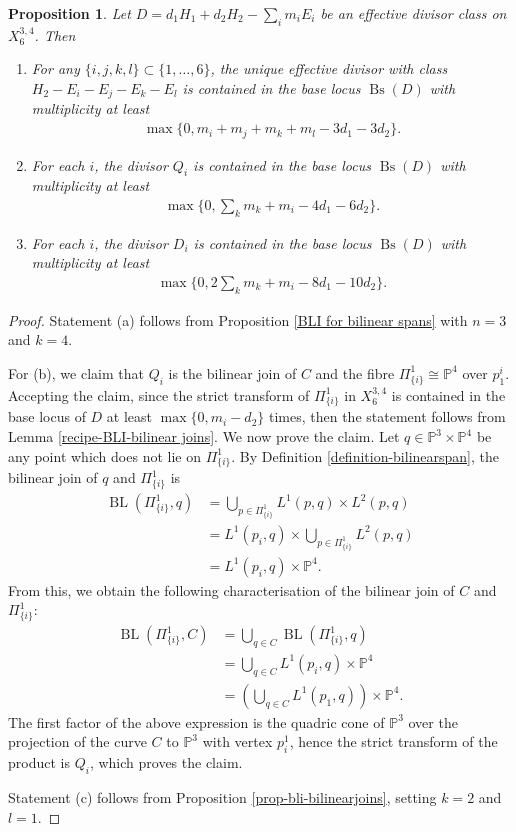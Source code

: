 \documentclass[a4paper,11pt]{article}
\newtheorem{proposition}[theorem]{Proposition}
\newcommand{\PP}{\mathbb P}
\newcommand{\Bs}{\operatorname{Bs}}
\newcommand{\BL}{\operatorname{BL}}
\begin{document}
 
\begin{proposition} \label{prop-bli-x346}
Let $D=d_1H_1+d_2H_2-\sum_i m_i E_i$ be an effective divisor class on $X^{3,4}_6$. Then
\begin{enumerate}
\item[(a)] For any $\{i,j,k,l\} \subset \{1,\ldots,6\}$, the unique effective divisor with class $H_2-E_i-E_j-E_k-E_l$ is contained in the base locus $\Bs(D)$ with multiplicity at least
\begin{align*}
    \max \{0, m_i+m_j+m_k+m_l-3d_1-3d_2 \}.
\end{align*} 
    \item[(b)] For each $i$, the divisor $Q_i$ is contained in the base locus $\Bs(D)$ with multiplicity at least
\begin{align*}
    \max \{0, \sum_k m_k + m_i - 4d_1-6d_2\}.
\end{align*}
\item[(c)] For each $i$, the divisor $D_i$ is contained in the base locus $\Bs(D)$ with multiplicity at least 
\begin{align*}
    \max \{0, 2 \sum_k m_k + m_i - 8d_1 - 10d_2\}.
\end{align*}
\end{enumerate}
\end{proposition}
\begin{proof}
Statement (a) follows from Proposition \ref{BLI for bilinear spans} with $n=3$ and $k=4$.

For (b), we claim that $Q_i$ is the bilinear join of $C$ and the fibre $\Pi^1_{\{i\}}\cong\PP^4$ over $p_1^i$. Accepting the claim, since the strict transform of $\Pi^1_{\{i\}}$ in $X^{3,4}_6$  is contained in the base locus of $D$ at least $\max\{0,m_i-d_2\}$ times, then the statement follows from Lemma \ref{recipe-BLI-bilinear joins}.
%
We now prove the claim. Let $q\in\PP^3\times\PP^4$ be any point which does not lie on $\Pi^1_{\{i\}}$. By Definition \ref{definition-bilinearspan}, the bilinear join of $q$ and $\Pi^1_{\{i\}}$ is
\begin{align*}
\BL(\Pi^1_{\{i\}},q)&=\bigcup_{p\in\Pi^1_{\{i\}}}L^1(p,q)\times L^2(p,q)\\
&=L^1(p_i,q)\times\bigcup_{p\in\Pi^1_{\{i\}}}L^2(p,q)\\
&=L^1(p_i,q)\times\PP^4.
\end{align*}
From this, we obtain the following characterisation of the bilinear join of $C$ and $\Pi^1_{\{i\}}$:
\begin{align*}
\BL(\Pi^1_{\{i\}},C)&=\bigcup_{q\in C}\BL(\Pi^1_{\{i\}},q)\\
&=\bigcup_{q\in C} L^1(p_i,q)\times\PP^4\\
&=\left(\bigcup_{q\in C} L^1(p_1,q)\right)\times\PP^4.
\end{align*}
The first factor of the above expression is the quadric cone of $\PP^3$ over the projection of the curve $C$ to $\PP^3$ with vertex $p_i^1$, hence the strict transform of the product is $Q_i$, which proves the claim.

Statement (c) follows from Proposition \ref{prop-bli-bilinearjoins}, setting $k=2$ and $l=1$.
\end{proof}
\end{document}
